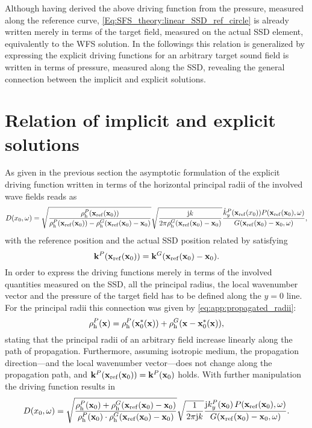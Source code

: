 Although having derived the above driving function from the pressure, measured along the reference curve, \eqref{Eq:SFS_theory:linear_SSD_ref_circle} is already written merely in terms of the target field, measured on the actual SSD element, equivalently to the WFS solution.
In the followings this relation is generalized by expressing the explicit driving functions for an arbitrary target sound field is written in terms of pressure, measured along the SSD, revealing the general connection between the implicit and explicit solutions.

\section{Relation of implicit and explicit solutions}

As given in the previous section the asymptotic formulation of the explicit driving function written in terms of the horizontal principal radii of the involved wave fields reads as
\begin{equation}
\label{eq:SFS_theory:spatial_sdm_3}
D(x_0,\omega) =
\footnotesize
\sqrt{\frac{\rho_\mathrm{h}^P(\mathbf{x}_{\mathrm{ref}}(\mathbf{x}_0))}{\rho_\mathrm{h}^P(\mathbf{x}_{\mathrm{ref}}(\mathbf{x}_0))-\rho_\mathrm{h}^G(\mathbf{x}_{\mathrm{ref}}(\mathbf{x}_0)-\mathbf{x}_0) }}
\sqrt{\frac{\mathrm{j} k}{2\pi \rho_\mathrm{h}^G(\mathbf{x}_{\mathrm{ref}}(\mathbf{x}_0)-\mathbf{x}_0)}} 
\frac{\hat{k}_y^{P}(\mathbf{x}_{\mathrm{ref}}(x_0))P(\mathbf{x}_{\mathrm{ref}}(\mathbf{x}_0),\omega)}{G(\mathbf{x}_{\mathrm{ref}}(\mathbf{x}_0)-\mathbf{x}_0,\omega)},
\end{equation}
with the reference position and the actual SSD position related by satisfying 
\begin{equation}
\label{Eq:stationary_evaluation_points}
\mathbf{k}^P(\mathbf{x}_{\mathrm{ref}}(\mathbf{x}_0)) = \mathbf{k}^G(\mathbf{x}_{\mathrm{ref}}(\mathbf{x}_0)-\mathbf{x}_0).
\end{equation}
In order to express the driving functions merely in terms of the involved quantities measured on the SSD, all the principal radius, the local wavenumber vector and the pressure of the target field has to be defined along the $y =0$ line.
For the principal radii this connection was given by \eqref{eq:app:propagated_radii}:
\begin{equation}
\label{Eq:principal_radii_addition}
\rho_\mathrm{h}^P(\mathbf{x})=  \rho_\mathrm{h}^P(\mathbf{x}_0^*(\mathbf{x})) + \rho_\mathrm{h}^G(\mathbf{x}-\mathbf{x}_0^*(\mathbf{x})),
\end{equation}
stating that the principal radii of an arbitrary field increase linearly along the path of propagation.
Furthermore, assuming isotropic medium, the propagation direction---and the local wavenumber vector---does not change along the propagation path, and $\mathbf{k}^P(\mathbf{x}_{\mathrm{ref}}(\mathbf{x}_0)) = \mathbf{k}^P(\mathbf{x}_0)$ holds.
With further manipulation the driving function results in
\begin{equation}
\label{eq:SFS_theory:spatial_sdm_3}
D(x_0,\omega) =
\small
\sqrt{\frac{\rho_\mathrm{h}^P(\mathbf{x}_0) + \rho_\mathrm{h}^G(\mathbf{x}_{\mathrm{ref}}(\mathbf{x}_0)-\mathbf{x}_0)}{\rho_\mathrm{h}^P(\mathbf{x}_0) \cdot \rho_\mathrm{h}^G(\mathbf{x}_{\mathrm{ref}}(\mathbf{x}_0)-\mathbf{x}_0) }}
\sqrt{\frac{1}{2\pi \mathrm{j} k}} 
\frac{\mathrm{j} k_y^{P}(\mathbf{x}_0) \, P(\mathbf{x}_{\mathrm{ref}}(\mathbf{x}_0),\omega)}{G(\mathbf{x}_{\mathrm{ref}}(\mathbf{x}_0)-\mathbf{x}_0,\omega)}.
\end{equation}

